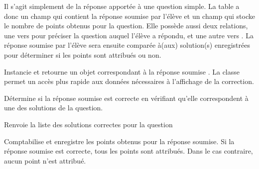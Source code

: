 \documentclass[a4,10pt,french]{sphinxmanual}
\begin{document}
\begin{fulllineitems}
\label{database:quiz.models.SqSubmit}
Il s'agit simplement de la réponse apportée à une question simple. La table
a donc un champ  qui contient la réponse soumise par l'élève et un champ
 qui stocke le nombre de points obtenus pour la question. Elle possède
aussi deux relations, une vers  pour préciser la question auquel
l'élève a répondu, et une autre vers . La réponse soumise par l'élève
sera ensuite comparée à(aux) solution(s) enregistrées pour déterminer si les points
sont attribués ou non.

\begin{fulllineitems}
\label{database:quiz.models.SqSubmit.build_correct}
Instancie et retourne un objet  correspondant à la réponse soumise .
La classe  permet un accès plus rapide aux données nécessaires à
l'affichage de la correction.

\end{fulllineitems}


\begin{fulllineitems}
\label{database:quiz.models.SqSubmit.correct}
Détermine si la réponse soumise est correcte en vérifiant qu'elle correspondent à
une des solutions de la question.

\end{fulllineitems}


\begin{fulllineitems}
\label{database:quiz.models.SqSubmit.get_corrections}
Renvoie la liste des solutions correctes pour la question

\end{fulllineitems}


\begin{fulllineitems}
\label{database:quiz.models.SqSubmit.save_result}
Comptabilise et enregistre les points obtenus pour la réponse soumise. Si la réponse soumise
est correcte, tous les points sont attribués. Dans le cas contraire,
aucun point n'est attribué.


\end{fulllineitems}
\end{fulllineitems}
\end{document}
